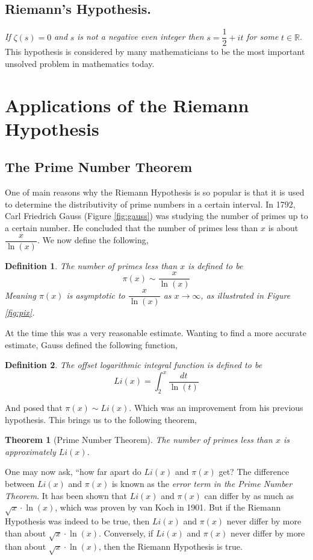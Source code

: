 \documentclass[12pt]{article}
\theoremstyle{plain}
\newtheorem{theorem}{Theorem}[section]
\newtheorem{definition}{Definition}
\newcommand{\R}{\mathbb{R}}
\begin{document}
	\subsection{Riemann's Hypothesis.} \textit{If} $ \zeta(s) = 0 $ \textit{and} $ s $ \textit{is not a negative even integer then} $ s = \dfrac{1}{2} + it $ \textit{for some} $ t \in \R $.\\
	
	\noindent This hypothesis is considered by many mathematicians to be the most important unsolved problem in mathematics today.
	
	
	\section{Applications of the Riemann Hypothesis}
	
	\subsection{The Prime Number Theorem}

	One of main reasons why the Riemann Hypothesis is so popular is that it is used to determine the distributivity of prime numbers in a certain interval. In 1792, Carl Friedrich Gauss (Figure \ref{fig:gauss}) was studying the number of primes up to a certain number. He concluded that the number of primes less than $ x $ is about $ \dfrac{x}{\ln(x)} $. We now define the following,
	\begin{definition}
		 The number of primes less than $ x $ is defined to be 
		 \[ \pi(x) \sim \frac{x}{\ln(x)} \]
		 Meaning $ \pi(x) $ is asymptotic to $ \dfrac{x}{\ln(x)} $ as $ x \to \infty $, as illustrated in Figure \ref{fig:pix}.
	\end{definition}
	 At the time this was a very reasonable estimate. Wanting to find a more accurate estimate, Gauss defined the following function,
	\begin{definition}
		The offset logarithmic integral function is defined to be
		\[ Li(x) = \int_2^x \frac{dt}{\ln(t)} \]
	\end{definition}
	And posed that $ \pi(x) \sim Li(x) $. Which was an improvement from his previous hypothesis. This brings us to the following theorem,
	\begin{theorem}[Prime Number Theorem]
		The number of primes less than $ x $ is approximately $ Li(x) $.
	\end{theorem}
	One may now ask, ``how far apart do $ Li(x) $ and $ \pi(x) $ get? The difference between $ Li(x) $ and $ \pi(x) $ is known as the \textit{error term in the Prime Number Theorem}. It has been shown that $ Li(x) $ and $ \pi(x) $ can differ by as much as $ \sqrt{x} \cdot \ln(x) $, which was proven by van Koch in 1901\cite{koch}. But if the Riemann Hypothesis was indeed to be true, then $ Li(x) $ and $ \pi(x) $ never differ by more than about $ \sqrt{x} \cdot \ln(x) $. Conversely, if $ Li(x) $ and $ \pi(x) $ never differ by more than about $ \sqrt{x} \cdot \ln(x) $, then the Riemann Hypothesis is true. 
	
\end{document}
